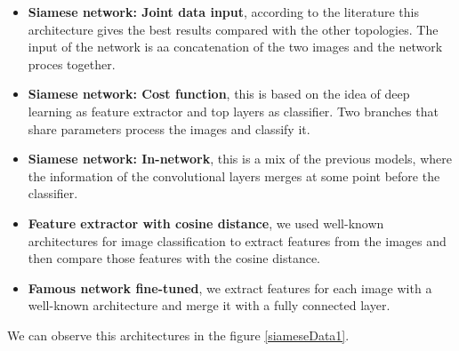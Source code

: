 \documentclass[12pt, a4paper, titlepage,twoside,openright]{article}
\begin{document}
\begin{itemize}

\item \textbf{Siamese network: Joint data input}, according to the literature this architecture gives the best results compared with the other topologies. The input of the network is aa concatenation of the two images and the network proces together.

\item \textbf{Siamese network: Cost function}, this is based on the idea of deep learning as feature extractor and top layers as classifier. Two branches that share parameters process the images and classify it.

\item \textbf{Siamese network: In-network}, this is a mix of the previous models, where the information of the convolutional layers merges at some point before the classifier.

\item \textbf{Feature extractor with cosine distance}, we used well-known architectures for image classification to extract features from the images and then compare those features with the cosine distance.

\item \textbf{Famous network fine-tuned}, we extract features for each image with a well-known architecture and merge it with a fully connected layer.

\end{itemize}

We can observe this architectures in the figure \ref{siameseData1}.
\end{document}
